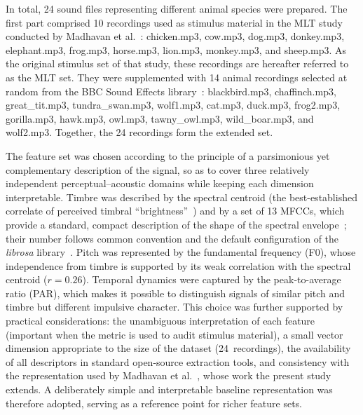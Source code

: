 \documentclass{article}
\begin{document}
In total, 24 sound files representing different animal species were prepared. The first part comprised 10 recordings used as stimulus material in the MLT study conducted by Madhavan et al.~\cite{MadhavanWrobel2024MLT}: chicken.mp3, cow.mp3, dog.mp3, donkey.mp3, elephant.mp3, frog.mp3, horse.mp3, lion.mp3, monkey.mp3, and sheep.mp3. As the original stimulus set of that study, these recordings are hereafter referred to as the MLT set. They were supplemented with 14 animal recordings selected at random from the BBC Sound Effects library~\cite{bbcrewind_soundeffects}: blackbird.mp3, chaffinch.mp3, great\_tit.mp3, tundra\_swan.mp3, wolf1.mp3, cat.mp3, duck.mp3, frog2.mp3, gorilla.mp3, hawk.mp3, owl.mp3, tawny\_owl.mp3, wild\_boar.mp3, and wolf2.mp3. Together, the 24 recordings form the extended set.

The feature set was chosen according to the principle of a parsimonious yet complementary description of the signal, so as to cover three relatively independent perceptual--acoustic domains while keeping each dimension interpretable. Timbre was described by the spectral centroid (the best-established correlate of perceived timbral ``brightness''~\cite{Grey1977Timbre,Lakatos2000Timbre,saitis2020brightness}) and by a set of 13 MFCCs, which provide a standard, compact description of the shape of the spectral envelope~\cite{Peeters2011TimbreToolbox,Siedenburg2017TimbreSimilarity,DeCamargo2017ProtaxSound}; their number follows common convention and the default configuration of the \textit{librosa} library~\cite{mcfee2015librosa}. Pitch was represented by the fundamental frequency (F0), whose independence from timbre is supported by its weak correlation with the spectral centroid ($r = 0.26$). Temporal dynamics were captured by the peak-to-average ratio (PAR), which makes it possible to distinguish signals of similar pitch and timbre but different impulsive character. This choice was further supported by practical considerations: the unambiguous interpretation of each feature (important when the metric is used to audit stimulus material), a small vector dimension appropriate to the size of the dataset (24~recordings), the availability of all descriptors in standard open-source extraction tools, and consistency with the representation used by Madhavan et al.~\cite{MadhavanWrobel2024MLT}, whose work the present study extends. A deliberately simple and interpretable baseline representation was therefore adopted, serving as a reference point for richer feature sets.
\end{document}
